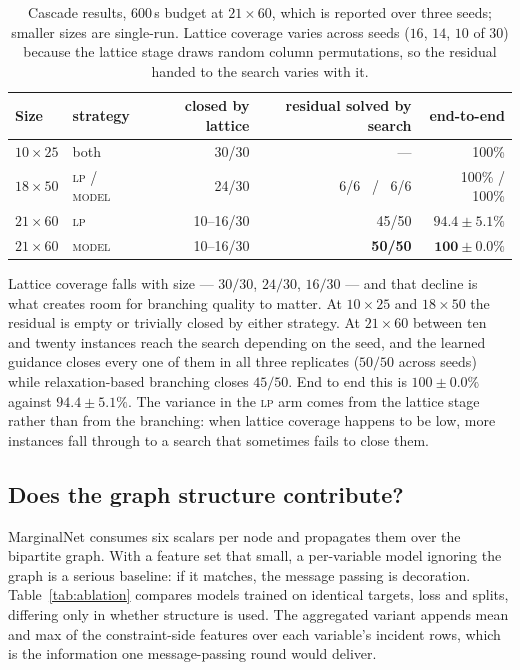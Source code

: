 \documentclass[11pt]{article}
\begin{document}
\begin{table}[h]
\centering
\begin{tabular}{llrrr}
\toprule
Size & strategy & closed by lattice & residual solved by search & end-to-end \\
\midrule
$10\times25$ & both & 30/30 & --- & 100\% \\
$18\times50$ & \textsc{lp} / \textsc{model} & 24/30 & 6/6 \ / \ 6/6 & 100\% / 100\% \\
$21\times60$ & \textsc{lp} & 10--16/30 & 45/50 & $94.4\pm5.1\%$ \\
$21\times60$ & \textsc{model} & 10--16/30 & \textbf{50/50} & $\mathbf{100\pm0.0\%}$ \\
\bottomrule
\end{tabular}
\caption{Cascade results, $600$\,s budget at $21\times60$, which is reported over three seeds; smaller sizes are single-run. Lattice coverage varies across seeds ($16$, $14$, $10$ of $30$) because the lattice stage draws random column permutations, so the residual handed to the search varies with it.}
\label{tab:cascade}
\end{table}

Lattice coverage falls with size --- $30/30$, $24/30$, $16/30$ --- and that decline is what creates room for branching quality to matter. At $10\times25$ and $18\times50$ the residual is empty or trivially closed by either strategy. At $21\times60$ between ten and twenty instances reach the search depending on the seed, and the learned guidance closes every one of them in all three replicates ($50/50$ across seeds) while relaxation-based branching closes $45/50$. End to end this is $100\pm0.0\%$ against $94.4\pm5.1\%$. The variance in the \textsc{lp} arm comes from the lattice stage rather than from the branching: when lattice coverage happens to be low, more instances fall through to a search that sometimes fails to close them.

\subsection{Does the graph structure contribute?}
\label{sec:exp-ablation}

MarginalNet consumes six scalars per node and propagates them over the bipartite graph. With a feature set that small, a per-variable model ignoring the graph is a serious baseline: if it matches, the message passing is decoration. Table~\ref{tab:ablation} compares models trained on identical targets, loss and splits, differing only in whether structure is used. The aggregated variant appends mean and max of the constraint-side features over each variable's incident rows, which is the information one message-passing round would deliver.
\end{document}
